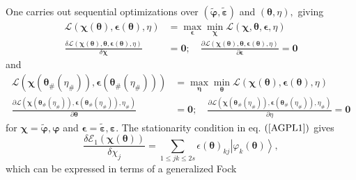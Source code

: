 \documentclass[aps,preprint]{revtex4}%
\begin{document}
One carries out sequential optimizations over $\left(  \mathbf{\tilde{\varphi
},\tilde{\varepsilon}}\right)  $ and $\left(  \mathbf{\theta,}\eta\right)  ,$
giving
\begin{align}
\mathcal{L}\left(  \mathbf{\chi\left(  \mathbf{\theta}\right)  ,\epsilon
\left(  \mathbf{\theta}\right)  ,}\eta\right)   &  =\max_{\mathbf{\epsilon}%
}\min_{\mathbf{\chi}}\mathcal{L}\left(  \mathbf{\chi,\theta},\mathbf{\epsilon
,}\eta\right) \nonumber\\
\frac{\delta\mathcal{L}\left(  \mathbf{\chi\left(  \mathbf{\theta}\right)
,\mathbf{\theta},\epsilon\left(  \mathbf{\theta}\right)  ,}\eta\right)
}{\delta\mathbf{\chi}}  &  =\mathbf{0};\quad\frac{\partial\mathcal{L}\left(
\mathbf{\chi\left(  \mathbf{\theta}\right)  ,\mathbf{\theta},\epsilon\left(
\mathbf{\theta}\right)  ,}\eta\right)  }{\partial\mathbf{\epsilon}}=\mathbf{0}
\label{AGPL1}%
\end{align}
and
\begin{align}
\mathcal{L}\left(  \mathbf{\chi}\left(  \mathbf{\theta}_{\#}\left(  \eta
_{\#}\right)  \right)  \mathbf{,\epsilon}\left(  \mathbf{\theta}_{\#}\left(
\eta_{\#}\right)  \right)  \right)   &  =\max_{\mathbf{\eta}}\min
_{\mathbf{\theta}}\mathcal{L}\left(  \mathbf{\chi\left(  \mathbf{\theta
}\right)  ,\epsilon\left(  \mathbf{\theta}\right)  ,}\eta\right) \nonumber\\
\frac{\partial\mathcal{L}\left(  \mathbf{\chi}\left(  \mathbf{\theta}%
_{\#}\left(  \eta_{\#}\right)  \right)  ,\mathbf{\epsilon}\left(
\mathbf{\theta}_{\#}\left(  \eta_{\#}\right)  \right)  \mathbf{,}\eta
_{\#}\right)  }{\partial\mathbf{\theta}}  &  =\mathbf{0};\quad\frac
{\partial\mathcal{L}\left(  \mathbf{\chi}\left(  \mathbf{\theta}_{\#}\left(
\eta_{\#}\right)  \right)  ,\mathbf{\epsilon}\left(  \mathbf{\theta}%
_{\#}\left(  \eta_{\#}\right)  \right)  \mathbf{,}\eta_{\#}\right)  }%
{\partial\eta}=\mathbf{0} \label{AGPL2}%
\end{align}
for $\mathbf{\chi=\tilde{\varphi},\varphi}$ and $\mathbf{\epsilon
=\tilde{\varepsilon},\varepsilon.}$ The stationarity condition in eq. $\left(
\ref{AGPL1}\right)  $ gives
\begin{equation}
\frac{\delta\mathcal{E}_{1}\left(  \mathbf{\chi\left(  \mathbf{\theta}\right)
}\right)  }{\delta\chi_{j}}=\sum_{1\leq jk\leq2s}\epsilon\mathbf{\left(
\mathbf{\theta}\right)  }_{kj}\left\vert \varphi_{k}\mathbf{\left(
\mathbf{\theta}\right)  }\right\rangle ,
\end{equation}
which can be expressed \cite{WeinerOrtiz05} in terms of a generalized Fock
\end{document}
